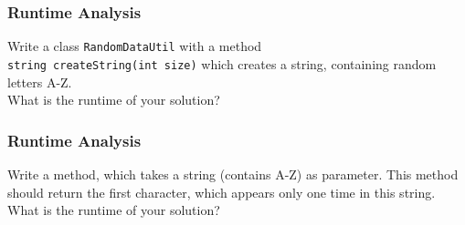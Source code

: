 \begin{frame}[fragile]
\frametitle{Runtime Analysis}
\begin{exercise}
Write a class \verb|RandomDataUtil| with a method\\
\verb|string createString(int size)| which creates a string, containing
random letters A-Z.\\
What is the runtime of your solution?
\end{exercise}

\end{frame}

\begin{frame}[fragile]
\frametitle{Runtime Analysis}
\begin{exercise}
Write a method, which takes a string (contains A-Z) as parameter. This method
should return the first character, which appears only one time
in this string.\\
What is the runtime of your solution?
\end{exercise}

\end{frame}


